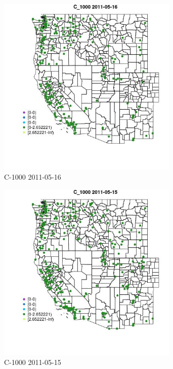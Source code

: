 \clearpage 

\begin{figure} 
\centering  
\includegraphics[width=0.77\textwidth]{Code_Outputs/ML_input_report_ML_input_PM25_Step5_part_d_de_duplicated_aves_ML_input_MapObsC_10002011-05-16.jpg} 
\caption{\label{fig:ML_input_report_ML_input_PM25_Step5_part_d_de_duplicated_aves_ML_inputMapObsC_10002011-05-16}C-1000 2011-05-16} 
\end{figure} 
 

\begin{figure} 
\centering  
\includegraphics[width=0.77\textwidth]{Code_Outputs/ML_input_report_ML_input_PM25_Step5_part_d_de_duplicated_aves_ML_input_MapObsC_10002011-05-15.jpg} 
\caption{\label{fig:ML_input_report_ML_input_PM25_Step5_part_d_de_duplicated_aves_ML_inputMapObsC_10002011-05-15}C-1000 2011-05-15} 
\end{figure} 
 

